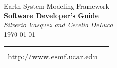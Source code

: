 \documentclass[english]{article}
\begin{document}

\begin{titlepage}

\begin{center}
{\Large    Earth System Modeling Framework } \\
{\Large {\bf  Software Developer's Guide}} \\
\medskip
{\it Silverio Vasquez and Cecelia DeLuca} \\
\vspace{.5in}
{\large \today}
\end{center}

\begin{latexonly}
\vspace{6in}
\begin{tabular}{p{5in}p{.9in}}
\hrulefill \\
\noindent http://www.esmf.ucar.edu \\
\end{tabular}
\end{latexonly}

\end{titlepage}

\tableofcontents

\newpage












\end{document}
